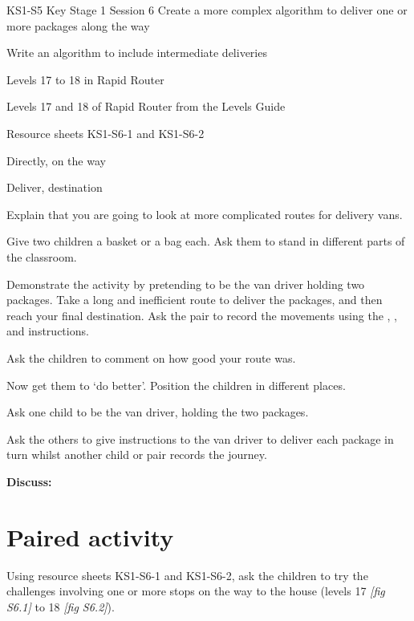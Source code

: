 \documentclass{../../../lessonplan}
\begin{document}
\lessonplantitle
    {KS1-S5}
    {Key Stage 1 Session 6}
    {Create a more complex algorithm to deliver one or more packages along the way}

\preamble
    {
    \item Write an algorithm to include intermediate deliveries 
    }
    {
    \item Levels 17 to 18 in Rapid Router
    \item Levels 17 and 18 of Rapid Router from the Levels Guide
    \item Resource sheets KS1-S6-1 and KS1-S6-2
    }
    {
    \item Directly, on the way
    \item Deliver, destination
    }

\begin{lessonplan}

Explain that you are going to look at more complicated routes for delivery vans.


Give two children a basket or a bag each.
Ask them to stand in different parts of the classroom.

Demonstrate the activity by pretending to be the van driver holding two packages.
Take a long and inefficient route to deliver the packages, and then reach your final destination.
Ask the pair to record the movements using the , , and  instructions.

Ask the children to comment on how good your route was.

Now get them to `do better'.
Position the children in different places.

Ask one child to be the van driver, holding the two packages.

Ask the others to give instructions to the van driver to deliver each package in turn whilst another child or pair records the journey.

\textbf{Discuss:} 

\section*{Paired activity}

Using resource sheets KS1-S6-1 and KS1-S6-2, ask the children to try the challenges involving one or more stops on the way to the house (levels 17 \textit{[fig S6.1]} to 18 \textit{[fig S6.2]}).


\end{lessonplan}
\end{document}
